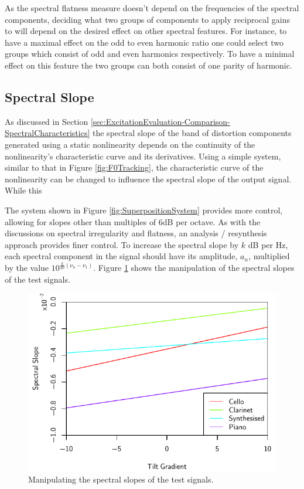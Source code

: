 		As the spectral flatness measure doesn't depend on the frequencies of the spectral components, deciding
		what two groups of components to apply reciprocal gains to will depend on the desired effect on other
		spectral features. For instance, to have a maximal effect on the odd to even harmonic ratio one could
		select two groups which consist of odd and even harmonics respectively. To have a minimal effect on this
		feature the two groups can both consist of one parity of harmonic.

	\subsection{Spectral Slope}
	\label{sec:FeatureControl-Parameterisation-Slope}
		As discussed in Section \ref{sec:ExcitationEvaluation-Comparison-SpectralCharacteristics} the spectral
		slope of the band of distortion components generated using a static nonlinearity depends on the continuity
		of the nonlinearity's characteristic curve and its derivatives. Using a simple system, similar to that in
		Figure \ref{fig:F0Tracking}, the characteristic curve of the nonlinearity can be changed to influence the
		spectral slope of the output signal. While this 

		The system shown in Figure \ref{fig:SuperpositionSystem} provides more control, allowing for slopes other
		than multiples of 6dB per octave. As with the discussions on spectral irregularity and flatness, an
		analysis / resynthesis approach provides finer control.  To increase the spectral slope by $k$ dB per Hz,
		each spectral component in the signal should have its amplitude, $a_{n}$, multiplied by the value
		$10^{\frac{k}{20}(\nu_{n} - \nu_{1})}$. Figure \ref{fig:MoveSlopes} shows the manipulation of the spectral
		slopes of the test signals.

		\begin{figure}[h!]
			\centering
			\includegraphics{chapter6/Images/MoveSlopes.pdf}
			\caption{Manipulating the spectral slopes of the test signals.}
			\label{fig:MoveSlopes}
		\end{figure}

